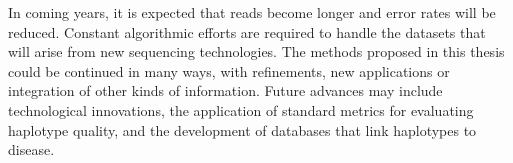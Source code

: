 In coming years, it is expected that reads become longer and error rates will be reduced.
Constant algorithmic efforts are required to handle the datasets that will arise from new sequencing technologies.
The methods proposed in this thesis could be continued in many ways,
with refinements, new applications or integration of other kinds of information. 
Future advances may include technological innovations, the application of standard metrics for evaluating haplotype quality, and the development of databases that link haplotypes to disease.

% 
% 
% 
% 
% 
% 
% 
% 
